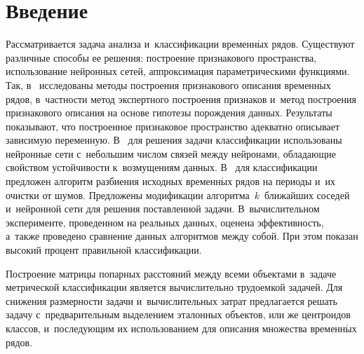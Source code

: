 


\thispagestyle{headings}

\begin{multicols}{2}

\label{st\stat}

\section{Введение}
 Рассматривается задача анализа и~классификации временн$\acute{\mbox{ы}}$х рядов. 
 Существуют различные спосо\-бы ее решения: построение признакового пространства, 
 использование нейронных сетей, аппроксимация параметрическими функциями. Так, 
 в~\cite{Kuznetsov} исследованы методы построения признакового описания временн$\acute{\mbox{ы}}$х 
 рядов, в~частности метод экспертного построения признаков и~метод построения 
 признакового описания на основе гипотезы порождения данных. Результаты~\cite{Kuznetsov} 
 показывают, что построенное признаковое пространство адекватно описывает 
 зависимую переменную. В~\cite{Popova2015} для решения задачи классификации 
 использованы нейронные сети с~небольшим числом связей между нейронами, 
 обладающие свойством устойчивости к~возмущениям данных. 
 В~\cite{Ignatov} для классификации предложен алгоритм разбиения исходных 
 временн$\acute{\mbox{ы}}$х рядов на периоды и~их очистки от шумов. Предложены модификации 
 алгоритма~$k$~ближайших соседей и~нейронной сети для решения по\-став\-лен\-ной задачи. 
 В~вычислительном эксперименте, проведенном на реальных данных, оценена эффективность, 
 а~также проведено сравнение данных алгоритмов между собой. При этом показан высокий 
 процент правильной классификации.

Построение матрицы попарных расстояний между всеми объектами 
в~задаче метрической классификации является вычислительно трудоемкой задачей. 
Для снижения размерности задачи и~вычислительных затрат предлагается решать задачу 
с~предварительным выделением эталонных объектов, или же центроидов классов, 
и~после\-ду\-ющим их использованием для описания множества вре\-мен\-н$\acute{\mbox{ы}}$х рядов.


\end{multicols}
